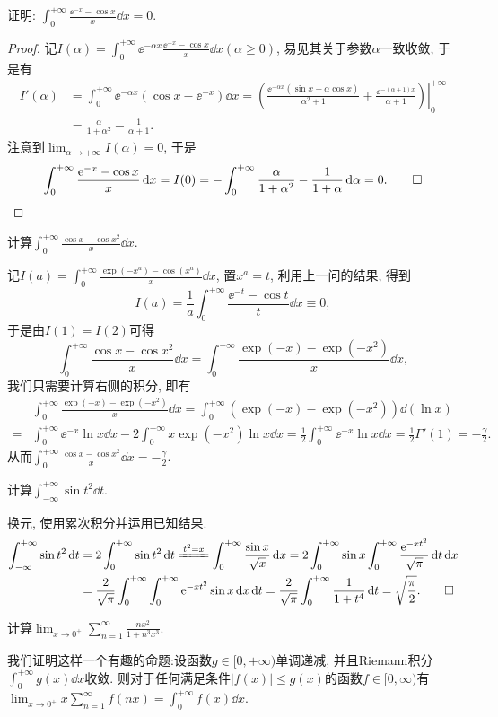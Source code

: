 \begin{quizb}
\woe 证明: \(\int_{0}^{+\infty}\frac{\ee^{-x}-\cos x}{x}\dd x=0\).
\begin{proof}
记\(I(\alpha)=\int_{0}^{+\infty}\ee^{-\alpha x}\frac{\ee^{-x}-\cos x}{x}\dd x(\alpha\geqslant0)\), 易见其关于参数\(\alpha\)一致收敛, 于是有\[\begin{split}
I'(\alpha)&=\int_{0}^{+\infty}\ee^{-\alpha x}\left(\cos x-\ee^{-x}\right)\dd x=\left.\left(\frac{\ee^{-\alpha x}(\sin x-\alpha\cos x)}{\alpha^2+1}+\frac{\ee^{-(\alpha+1)x}}{\alpha+1}\right)\right|_0^{+\infty}\\&=\frac{\alpha}{1+\alpha^2}-\frac{1}{\alpha+1}.
\end{split}\]
注意到\(\lim_{\alpha\rightarrow+\infty}I(\alpha)=0\), 于是\[\int_{0}^{+\infty}\frac{\mathrm{e}^{-x}-\cos x}{x}\,\mathrm{d} x=I(0)=-\int_{0}^{+\infty}\frac{\alpha}{1+\alpha^2}-\frac{1}{1+\alpha}\,\mathrm{d} \alpha=0.\qedhere\]
\end{proof}
\woe 计算\(\int_{0}^{+\infty}\frac{\cos x-\cos x^2}{x}\dd x\).
\begin{solution}
记\(I(a)=\int_{0}^{+\infty}\frac{\exp(-x^a)-\cos(x^a)}{x}\dd x\), 置\(x^a=t\), 利用上一问的结果, 得到\[I(a)=\frac{1}{a}\int_{0}^{+\infty}\frac{\ee^{-t}-\cos t}{t}\dd x\equiv 0,\]于是由\(I(1)=I(2)\)可得\[\int_{0}^{+\infty}\frac{\cos x-\cos x^2}{x}\dd x=\int_{0}^{+\infty}\frac{\exp(-x)-\exp(-x^2)}{x}\dd x,\]我们只需要计算右侧的积分, 即有\[\begin{split}
	&\int_{0}^{+\infty}\frac{\exp(-x)-\exp(-x^2)}{x}\dd x=\int_{0}^{+\infty}\left(\exp(-x)-\exp(-x^2)\right)\dd\left(\ln x\right)\\=&\int_{0}^{+\infty}\ee^{-x}\ln x\dd x-2\int_{0}^{+\infty}x\exp(-x^2)\ln x\dd x=\frac{1}{2}\int_{0}^{+\infty}\ee^{-x}\ln x\dd x=\frac{1}{2}\Gamma'(1)=-\frac{\gamma}{2}.
\end{split}\]从而\(\int_{0}^{+\infty}\frac{\cos x-\cos x^2}{x}\dd x=-\frac{\gamma}{2}.\)
\end{solution}
\woe 计算\(\int_{-\infty}^{+\infty}\sin t^2\dd t\).
\begin{solution}
换元, 使用累次积分并运用已知结果.
\[\begin{split}
\int_{-\infty}^{+\infty}\sin t^2\dd t&=2\int_{0}^{+\infty}\sin t^2\dd t\xlongequal{t^2=x}\int_{0}^{+\infty}\frac{\sin x}{\sqrt{x}}\dd x=2\int_{0}^{+\infty}\sin x\int_{0}^{+\infty}\frac{\ee^{-xt^2}}{\sqrt{\pi}}\dd t\dd x\\&=\frac{2}{\sqrt{\pi}}\int_{0}^{+\infty}\int_{0}^{+\infty}\ee^{-xt^2}\sin x\dd x\dd t=\frac{2}{\sqrt{\pi}}\int_{0}^{+\infty}\frac{1}{1+t^4}\dd t=\sqrt{\frac{\pi}{2}}.\qedhere
\end{split}\]
\end{solution}
\woe 计算\(\lim_{x\rightarrow 0^+}\sum_{n=1}^{\infty}\frac{nx^2}{1+n^3x^3}\).
\begin{solution}
我们证明这样一个有趣的命题:设函数\(g\in[0,+\infty)\)单调递减, 并且Riemann积分\(\int_{0}^{+\infty}g(x)\dd x\)收敛. 则对于任何满足条件\(|f(x)|\leqslant g(x)\)的函数\(f\in[0,\infty)\)有\(\lim_{x\rightarrow0^+}x\sum_{n=1}^{\infty}f(nx)=\int_{0}^{+\infty}f(x)\dd x\).


\end{solution}
\end{quizb}
